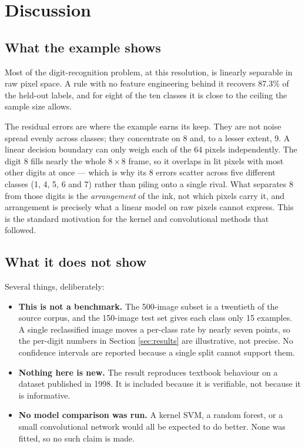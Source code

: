 \section{Discussion}
\label{sec:discussion}

\subsection{What the example shows}

Most of the digit-recognition problem, at this resolution, is linearly
separable in raw pixel space. A rule with no feature engineering behind it
recovers 87.3\% of the held-out labels, and for eight of the ten classes it is
close to the ceiling the sample size allows.

The residual errors are where the example earns its keep. They are not noise
spread evenly across classes; they concentrate on 8 and, to a lesser extent, 9.
A linear decision boundary can only weigh each of the 64 pixels independently.
The digit 8 fills nearly the whole $8\times8$ frame, so it overlaps in lit
pixels with most other digits at once --- which is why its 8 errors scatter
across five different classes (1, 4, 5, 6 and 7) rather than piling onto a
single rival. What separates 8 from those digits is the \emph{arrangement} of
the ink, not which pixels carry it, and arrangement is precisely what a linear
model on raw pixels cannot express. This is the standard motivation for the
kernel and convolutional methods that followed.

\subsection{What it does not show}

Several things, deliberately:

\begin{itemize}
  \item \textbf{This is not a benchmark.} The 500-image subset is a twentieth
    of the source corpus, and the 150-image test set gives each class only 15
    examples. A single reclassified image moves a per-class rate by nearly
    seven points, so the per-digit numbers in Section \ref{sec:results} are
    illustrative, not precise. No confidence intervals are reported because a
    single split cannot support them.
  \item \textbf{Nothing here is new.} The result reproduces textbook behaviour
    on a dataset published in 1998. It is included because it is verifiable,
    not because it is informative.
  \item \textbf{No model comparison was run.} A kernel SVM, a random forest, or
    a small convolutional network would all be expected to do better. None was
    fitted, so no such claim is made.
\end{itemize}

